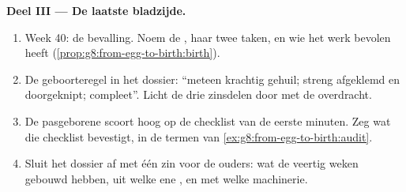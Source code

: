 \begin{problem}
\medskip\noindent\textbf{Deel III --- De laatste bladzijde.}
\begin{enumerate}[resume]
  \item Week 40: de bevalling. Noem de , haar twee taken, en wie het
        werk bevolen heeft
        (\cref{prop:g8:from-egg-to-birth:birth}).
  \item De geboorteregel in het dossier: ``meteen krachtig gehuil; streng
        afgeklemd en doorgeknipt;  compleet''. Licht de drie
        zinsdelen door met de overdracht.
  \item De pasgeborene scoort hoog op de checklist van de eerste minuten.
        Zeg wat die checklist bevestigt, in de termen van
        \cref{ex:g8:from-egg-to-birth:audit}.
  \item Sluit het dossier af met één zin voor de ouders: wat de veertig
        weken gebouwd hebben, uit welke ene , en met welke machinerie.
\end{enumerate}
\end{problem}
